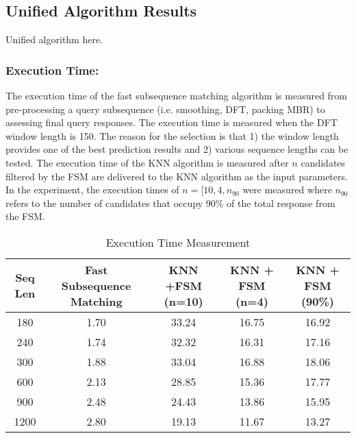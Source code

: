 \subsection{Unified Algorithm Results}

Unified algorithm here.

\subsubsection{Execution Time:} The execution time of the fast subsequence matching algorithm is measured from pre-processing a query subsequence (i.e. smoothing, DFT, packing MBR) to assessing final query responses. The execution time is measured when the DFT window length is 150. The reason for the selection is that 1) the window length provides one of the best prediction results and 2) various sequence lengths can be tested. 
The execution time of the KNN algorithm is measured after $n$ candidates filtered by the FSM are delivered to the KNN algorithm as the input parameters. In the experiment, the execution times of $n = [10, 4, n_{90}$ were measured where $n_{90}$ refers to the number of candidates that occupy 90\% of the total response from the FSM.


\begin{table}[h!]
\begin{center}
\begin{tabular}{|c|| c| c| c| c| }
\hline
Seq Len & Fast Subsequence Matching & KNN +FSM (n=10) & KNN + FSM (n=4) & KNN + FSM (90\%)
\tabularnewline
\hline
180 & 1.70 & 33.24 & 16.75 & 16.92
\tabularnewline
240 & 1.74 & 32.32 & 16.31 & 17.16 
\tabularnewline
300 & 1.88 & 33.04 & 16.88 & 18.06 
\tabularnewline
600 & 2.13 & 28.85 & 15.36 & 17.77
\tabularnewline
900 & 2.48 & 24.43 & 13.86 & 15.95
\tabularnewline
1200 & 2.80 & 19.13 & 11.67 & 13.27
\tabularnewline
\hline
\end{tabular}
\end{center}
\caption{Execution Time Measurement}
\label{tab:exec_table}
\end{table}
